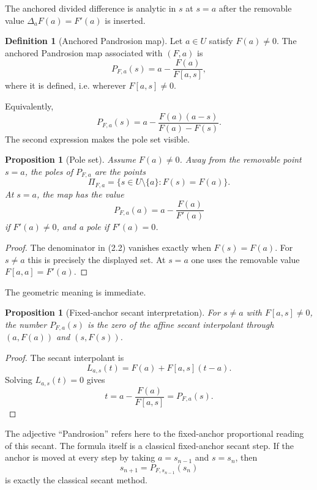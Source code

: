\documentclass[11pt]{article}
\newtheorem{proposition}[theorem]{Proposition}
\theoremstyle{definition}
\newtheorem{definition}[theorem]{Definition}
\begin{document}
The anchored divided difference is analytic in $s$ at $s=a$ after the removable value $\Delta_aF(a)=F'(a)$ is inserted.

\begin{definition}[Anchored Pandrosion map]
Let $a\in U$ satisfy $F(a)\ne0$.  The anchored Pandrosion map associated with $(F,a)$ is
\[
        P_{F,a}(s)=a-\frac{F(a)}{F[a,s]},
        \tag{2.1}
\]
where it is defined, i.e. wherever $F[a,s]\ne0$.
\end{definition}

Equivalently,
\[
        P_{F,a}(s)=a-\frac{F(a)(a-s)}{F(a)-F(s)}.
        \tag{2.2}
\]
The second expression makes the pole set visible.

\begin{proposition}[Pole set]
Assume $F(a)\ne0$.  Away from the removable point $s=a$, the poles of $P_{F,a}$ are the points
\[
        \Pi_{F,a}=\{s\in U\setminus\{a\}: F(s)=F(a)\}.
\]
At $s=a$, the map has the value
\[
        P_{F,a}(a)=a-\frac{F(a)}{F'(a)}
\]
if $F'(a)\ne0$, and a pole if $F'(a)=0$.
\end{proposition}

\begin{proof}
The denominator in (2.2) vanishes exactly when $F(s)=F(a)$.  For $s\ne a$ this is precisely the displayed set.  At $s=a$ one uses the removable value $F[a,a]=F'(a)$.
\end{proof}

The geometric meaning is immediate.

\begin{proposition}[Fixed-anchor secant interpretation]
For $s\ne a$ with $F[a,s]\ne0$, the number $P_{F,a}(s)$ is the zero of the affine secant interpolant through $(a,F(a))$ and $(s,F(s))$.
\end{proposition}

\begin{proof}
The secant interpolant is
\[
        L_{a,s}(t)=F(a)+F[a,s](t-a).
\]
Solving $L_{a,s}(t)=0$ gives
\[
        t=a-\frac{F(a)}{F[a,s]}=P_{F,a}(s).
\]
\end{proof}

The adjective ``Pandrosion'' refers here to the fixed-anchor proportional reading of this secant.  The formula itself is a classical fixed-anchor secant step.  If the anchor is moved at every step by taking $a=s_{n-1}$ and $s=s_n$, then
\[
        s_{n+1}=P_{F,s_{n-1}}(s_n)
\]
is exactly the classical secant method.
\end{document}

